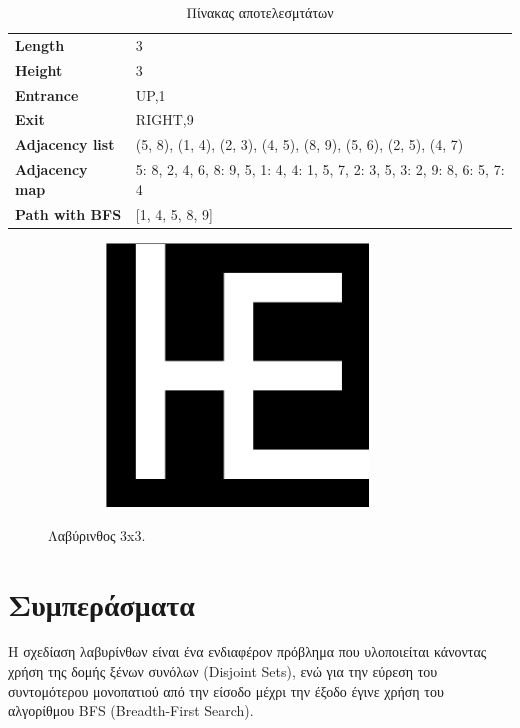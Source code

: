 \documentclass[paper=a4, fontsize=11pt]{scrartcl}
\numberwithin{equation}{section}		%
\numberwithin{figure}{section}			%
\numberwithin{table}{section}				%
\begin{document}
 \centering
\begin{table}[htbp]
  \caption{Πίνακας αποτελεσμτάτων}
    \begin{tabular}{ll} \\
    \textbf{Length} & 3 \\
    \textbf{Height} & 3 \\
    \textbf{Entrance} & UP,1 \\
    \textbf{Exit} & RIGHT,9 \\
    \textbf{Adjacency list} & {(5, 8), (1, 4), (2, 3), (4, 5), (8, 9), (5, 6), (2, 5), (4, 7)} \\
    \textbf{Adjacency map} & {5: {8, 2, 4, 6}, 
                              8: {9, 5}, 
                              1: {4}, 
                              4: {1, 5, 7}, 
                              2: {3, 5}, 
                              3: {2}, 
                              9: {8}, 
                              6: {5}, 
                              7: {4}} \\
    \textbf{Path with BFS} & [1, 4, 5, 8, 9] \\
    \end{tabular}%
  \label{tab:results}%
\end{table}%


\begin{figure}[h]
    \caption{Λαβύρινθος 3x3.}
    \centering
    \includegraphics[width=10cm, height=7cm]{maze.png}
    \label{fig:maze}
\end{figure}  


    
\section{Συμπεράσματα}
      Η σχεδίαση λαβυρίνθων είναι ένα ενδιαφέρον πρόβλημα που υλοποιείται κάνοντας χρήση της δομής ξένων συνόλων (Disjoint Sets), ενώ για την εύρεση του συντομότερου μονοπατιού από την είσοδο μέχρι την έξοδο έγινε χρήση του αλγορίθμου BFS (Breadth-First Search).
    
    
\end{document}
